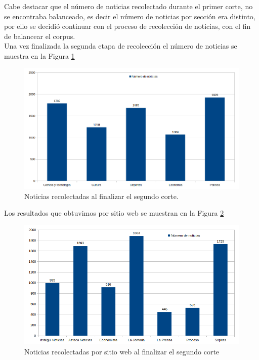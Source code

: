 Cabe destacar que el número de noticias recolectado durante el primer corte, no se encontraba balanceado, es decir el número de noticias por sección era distinto, por ello se decidió continuar con el proceso de recolección de noticias, con el fin de balancear el corpus.\\
Una vez finalizada la segunda etapa de recolección el número de noticias se muestra en la Figura \ref{Fig:notseccion} 

\begin{figure}[H]
	\centering
	\includegraphics[scale=.42]{imagenes/Capitulo5/noticiasPorSeccionV2.png}
	\caption{Noticias recolectadas al finalizar el segundo corte.}
	\label{Fig:notseccion}
\end{figure}

Los resultados que obtuvimos por sitio web se muestran en la Figura \ref{Fig:notPorSit} 

\begin{figure}[H]
	\centering
	\includegraphics[scale=.45]{imagenes/Capitulo5/noticiasPorSitio.png}
	\caption{Noticias recolectadas por sitio web al finalizar el segundo corte}
	\label{Fig:notPorSit}
\end{figure}

